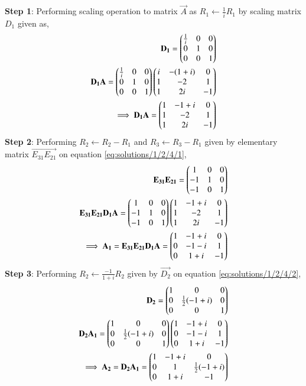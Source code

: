 \textbf{Step 1}: Performing scaling operation to matrix $\vec{A}$ as $R_1\leftarrow \frac{1}{i}R_1$ by scaling matrix $D_1$ given as,
\begin{align}
\mathbf{D_1} = \begin{pmatrix}\frac{1}{i}&0&0\\0&1&0\\0&0&1\end{pmatrix}\\
\mathbf{D_1A} = \begin{pmatrix}\frac{1}{i}&0&0\\0&1&0\\0&0&1\end{pmatrix}\begin{pmatrix}i&-(1+i)&0\\1&-2&1\\1&2i&-1\end{pmatrix}\\
\implies\mathbf{D_1A} = \begin{pmatrix}1&-1+i&0\\1&-2&1\\1&2i&-1\end{pmatrix}\label{eq:solutions/1/2/4/1}
\end{align}
\textbf{Step 2}: Performing $R_2 \leftarrow R_2-R_1$ and $R_3 \leftarrow R_3-R_1$ given by elementary matrix $\vec{E_{31}E_{21}}$ on equation \eqref{eq:solutions/1/2/4/1},
\begin{align}
\mathbf{E_{31}E_{21}} = \begin{pmatrix}1&0&0\\-1&1&0\\-1&0&1\end{pmatrix}\\
\mathbf{E_{31}E_{21}D_1A} = \begin{pmatrix}1&0&0\\-1&1&0\\-1&0&1\end{pmatrix}\begin{pmatrix}1&-1+i&0\\1&-2&1\\1&2i&-1\end{pmatrix}\\
\implies\mathbf{A_1} = \mathbf{E_{31}E_{21}D_1A} = \begin{pmatrix}1&-1+i&0\\0&-1-i&1\\0&1+i&-1\end{pmatrix}\label{eq:solutions/1/2/4/2}
\end{align}
\textbf{Step 3}: Performing $R_2\leftarrow \frac{-1}{1+i}R_2$ given by $\vec{D_2}$ on equation \eqref{eq:solutions/1/2/4/2},
\begin{align}
\mathbf{D_2} = \begin{pmatrix}1&0&0\\0&\frac{1}{2}(-1+i)&0\\0&0&1\end{pmatrix}\\
\mathbf{D_2A_1} = \begin{pmatrix}1&0&0\\0&\frac{1}{2}(-1+i)&0\\0&0&1\end{pmatrix}\begin{pmatrix}1&-1+i&0\\0&-1-i&1\\0&1+i&-1\end{pmatrix}\\
\implies \mathbf{A_2}=\mathbf{D_2A_1} = \begin{pmatrix}1&-1+i&0\\0&1&\frac{1}{2}(-1+i)\\0&1+i&-1\end{pmatrix}\label{eq:solutions/1/2/4/3}
\end{align}
